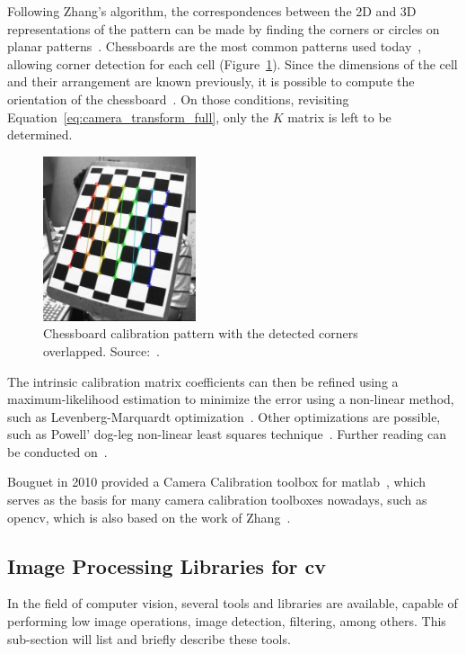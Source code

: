 Following Zhang's algorithm, the correspondences between the 2D and 3D representations of the pattern can be made by finding the corners or circles on planar patterns~\cite{opencv, mvg_book}. Chessboards are the most common patterns used today~\cite{opencv}, allowing corner detection for each cell (Figure~\ref{fig:opencv_calib_pattern}). Since the dimensions of the cell and their arrangement are known previously, it is possible to compute the orientation of the chessboard~\cite{Zhang2000, opencv_doc, mvg_book}. On those conditions, revisiting Equation~\eqref{eq:camera_transform_full}, only the $K$ matrix is left to be determined. 

\begin{figure}[!ht]
	\centering
	\includegraphics[width=0.4\textwidth, keepaspectratio]{img/camera/calib_pattern.jpg}
	\caption[Chessboard calibration pattern with the corners used for calibration.]{Chessboard calibration pattern with the detected corners overlapped. Source:~\cite{OpenCV_camera_calib}.}
	\label{fig:opencv_calib_pattern}
\end{figure}

The intrinsic calibration matrix coefficients can then be refined using a maximum-likelihood estimation to minimize the error using a non-linear method, such as Levenberg-Marquardt optimization~\cite{Levenberg1943}. Other optimizations are possible, such as Powell’ dog-leg non-linear least squares technique~\cite{Lourakis2005}. Further reading can be conducted on~\cite{mvg_book, Sturm2010, camera_models, Xu1996a}.

Bouguet in 2010 provided a Camera Calibration toolbox for \ac{matlab}~\cite{Bouguet2010}, which serves as the basis for many camera calibration toolboxes nowadays, such as \ac{opencv}, which is also based on the work of Zhang~\cite{opencv}.

\subsection{Image Processing Libraries for \acl{cv}}
In the field of computer vision, several tools and libraries are available, capable of performing low image operations, image detection, filtering, among others. This sub-section will list and briefly describe these tools.

